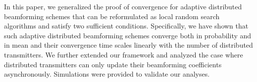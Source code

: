 \documentclass{article}
\begin{document}
In this paper, we generalized the proof of convergence for adaptive distributed beamforming schemes that can be reformulated as local random search algorithms and 
satisfy two sufficient conditions. Specifically, we have shown that such adaptive distributed beamforming schemes converge both in probability and in mean and their convergence time scales linearly with the number of distributed transmitters. We further extended our framework and analyzed the case where distributed transmitters can only update their beamforming coefficients asynchronously. Simulations were provided to validate our analyses.




\footnotesize

\end{document}
